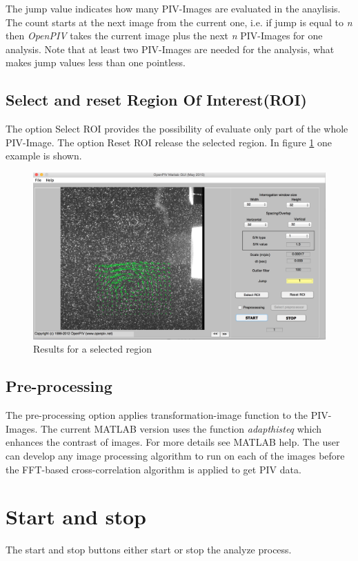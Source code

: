 The jump value indicates how many PIV-Images are evaluated in the anaylisis. The count starts at 
the next image from the current one, i.e. if jump is equal to \emph{n} then \emph{OpenPIV} takes 
the current image plus the next \emph{n} PIV-Images for one analysis. Note that at least two 
PIV-Images are needed for the analysis, what makes jump values less than one pointless.

\subsection{Select and reset Region Of Interest(ROI)}\label{ROI}
The option Select ROI provides the possibility of evaluate only part of the whole PIV-Image. The 
option Reset ROI release the selected region. In figure \ref{fig:ROI} one example is shown.

\begin{figure}[H]
	\centering
	\includegraphics[width=\textwidth]{Images/ROI.png}
	\caption{Results for a selected region}
	\label{fig:ROI}
\end{figure}

\subsection{Pre-processing}\label{Preprocessing}
The pre-processing option applies transformation-image function to the PIV-Images. The current  MATLAB version uses the function \emph{adapthisteq} which enhances the contrast of images.  For more details see MATLAB help. The user can develop any image processing algorithm to run on each of the images before the FFT-based cross-correlation algorithm is applied to get PIV data. 

\section{Start and stop}\label{Start}
The start and stop buttons either start or stop the analyze process.

